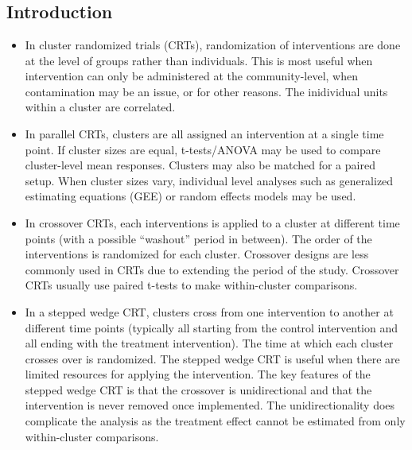 \documentclass{article}
\begin{document}
\tableofcontents


\newpage


\section{\parencite{Hussey:2007}}

\subsection{Introduction}

\begin{itemize}

\item
In cluster randomized trials (CRTs), randomization of interventions are done at the level of groups rather than individuals. This is most useful when intervention can only be administered at the community-level, when contamination may be an issue, or for other reasons. The inidividual units within a cluster are correlated.

\item
In parallel CRTs, clusters are all assigned an intervention at a single time point. If cluster sizes are equal, t-tests/ANOVA may be used to compare cluster-level mean responses. Clusters may also be matched for a paired setup. When cluster sizes vary, individual level analyses such as generalized estimating equations (GEE) or random effects models may be used.

\item
In crossover CRTs, each interventions is applied to a cluster at different time points (with a possible ``washout'' period in between). The order of the interventions is randomized for each cluster. Crossover designs are less commonly used in CRTs due to extending the period of the study. Crossover CRTs usually use paired t-tests to make within-cluster comparisons.

\item
In a stepped wedge CRT, clusters cross from one intervention to another at different time points (typically all starting from the control intervention and all ending with the treatment intervention). The time at which each cluster crosses over is randomized. The stepped wedge CRT is useful when there are limited resources for applying the intervention. The key features of the stepped wedge CRT is that the crossover is unidirectional and that the intervention is never removed once implemented. The unidirectionality does complicate the analysis as the treatment effect cannot be estimated from only within-cluster comparisons.

\end{itemize}
\end{document}
